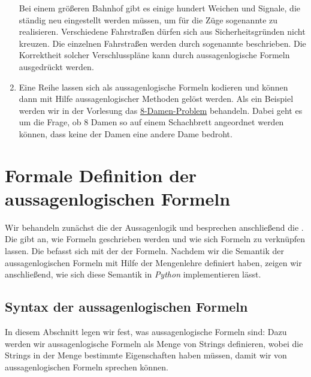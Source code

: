 \begin{enumerate}
      Bei einem größeren Bahnhof gibt es einige hundert Weichen und Signale, die ständig
      neu eingestellt werden müssen, um für die Züge sogenannte  zu
      realisieren.  Verschiedene Fahrstraßen dürfen sich aus Sicherheitsgründen nicht kreuzen.  
      Die einzelnen Fahrstraßen werden durch sogenannte  beschrieben.
      Die Korrektheit solcher Verschlusspläne kann durch aussagenlogische Formeln ausgedrückt werden.
\item Eine Reihe  lassen sich als aussagenlogische Formeln
      kodieren und können dann mit Hilfe aussagenlogischer Methoden gelöst werden.  Als ein
      Beispiel werden wir in der Vorlesung das 
      \href{https://en.wikipedia.org/wiki/Eight_queens_puzzle}{8-Damen-Problem} behandeln.  Dabei
      geht es um die Frage, ob 8 Damen so auf einem Schachbrett angeordnet werden können, dass
      keine der Damen eine andere Dame bedroht.
\end{enumerate}

\section{Formale Definition der aussagenlogischen Formeln}
Wir behandeln zunächst die  der Aussagenlogik und besprechen anschließend die
.  Die  gibt an, wie Formeln geschrieben werden und wie sich Formeln zu
 verknüpfen lassen.  Die  befasst sich mit der  der Formeln.
Nachdem wir die Semantik der aussagenlogischen Formeln mit Hilfe der Mengenlehre definiert haben, zeigen wir
anschließend, wie sich diese Semantik in \textsl{Python} implementieren lässt.

\subsection{Syntax der aussagenlogischen Formeln}
In diesem Abschnitt legen wir fest, was aussagenlogische Formeln sind:  Dazu werden wir aussagenlogische
Formeln als Menge von Strings definieren, wobei die Strings in der Menge bestimmte Eigenschaften haben müssen,
damit wir von aussagenlogischen Formeln sprechen können.


